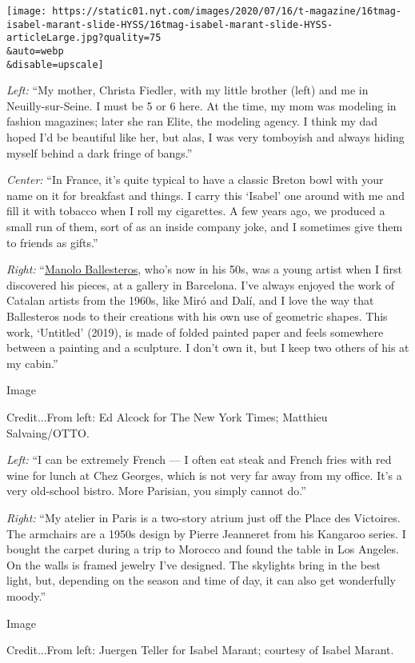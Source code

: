 \texttt{[image: https://static01.nyt.com/images/2020/07/16/t-magazine/16tmag-isabel-marant-slide-HYSS/16tmag-isabel-marant-slide-HYSS-articleLarge.jpg?quality=75\\\&auto=webp\\\&disable=upscale]}

\emph{Left:} ``My mother, Christa Fiedler, with my little brother (left)
and me in Neuilly-sur-Seine. I must be 5 or 6 here. At the time, my mom
was modeling in fashion magazines; later she ran Elite, the modeling
agency. I think my dad hoped I'd be beautiful like her, but alas, I was
very tomboyish and always hiding myself behind a dark fringe of bangs.''

\emph{Center:} ``In France, it's quite typical to have a classic Breton
bowl with your name on it for breakfast and things. I carry this
`Isabel' one around with me and fill it with tobacco when I roll my
cigarettes. A few years ago, we produced a small run of them, sort of as
an inside company joke, and I sometimes give them to friends as gifts.''

\emph{Right:} ``\href{https://www.manoloballesteros.com/}{Manolo
Ballesteros}, who's now in his 50s, was a young artist when I first
discovered his pieces, at a gallery in Barcelona. I've always enjoyed
the work of Catalan artists from the 1960s, like Miró and Dalí, and I
love the way that Ballesteros nods to their creations with his own use
of geometric shapes. This work, `Untitled' (2019), is made of folded
painted paper and feels somewhere between a painting and a sculpture. I
don't own it, but I keep two others of his at my cabin.''

Image

Credit...From left: Ed Alcock for The New York Times; Matthieu
Salvaing/OTTO.

\emph{Left:} ``I can be extremely French --- I often eat steak and
French fries with red wine for lunch at Chez Georges, which is not very
far away from my office. It's a very old-school bistro. More Parisian,
you simply cannot do.''

\emph{Right:} ``My atelier in Paris is a two-story atrium just off the
Place des Victoires. The armchairs are a 1950s design by Pierre
Jeanneret from his Kangaroo series. I bought the carpet during a trip to
Morocco and found the table in Los Angeles. On the walls is framed
jewelry I've designed. The skylights bring in the best light, but,
depending on the season and time of day, it can also get wonderfully
moody.''

Image

Credit...From left: Juergen Teller for Isabel Marant; courtesy of Isabel
Marant.

